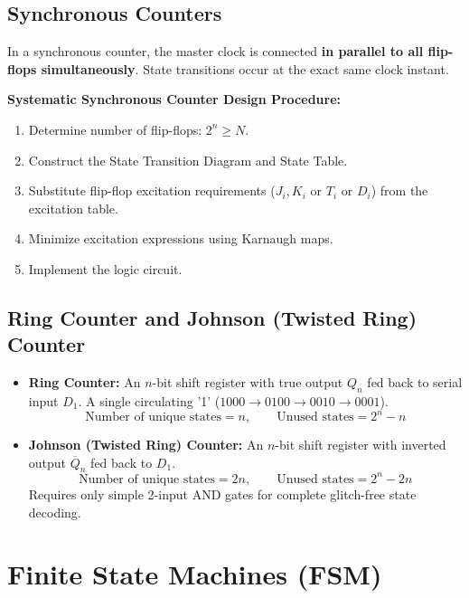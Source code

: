 \documentclass[12pt,a4paper]{article}
\begin{document}
\subsection{Synchronous Counters}
In a synchronous counter, the master clock is connected \textbf{in parallel to all flip-flops simultaneously}. State transitions occur at the exact same clock instant.

\textbf{Systematic Synchronous Counter Design Procedure:}
\begin{enumerate}[label=\arabic*., leftmargin=*]
  \item Determine number of flip-flops: $2^n \ge N$.
  \item Construct the State Transition Diagram and State Table.
  \item Substitute flip-flop excitation requirements ($J_i, K_i$ or $T_i$ or $D_i$) from the excitation table.
  \item Minimize excitation expressions using Karnaugh maps.
  \item Implement the logic circuit.
\end{enumerate}

\subsection{Ring Counter and Johnson (Twisted Ring) Counter}
\begin{itemize}[leftmargin=*, itemsep=3pt]
  \item \textbf{Ring Counter:} An $n$-bit shift register with true output $Q_n$ fed back to serial input $D_1$. A single circulating '1' ($1000 \to 0100 \to 0010 \to 0001$).
    \begin{equation}
      \text{Number of unique states} = n, \qquad \text{Unused states} = 2^n - n
    \end{equation}
  \item \textbf{Johnson (Twisted Ring) Counter:} An $n$-bit shift register with inverted output $\overline{Q}_n$ fed back to $D_1$.
    \begin{equation}
      \text{Number of unique states} = 2n, \qquad \text{Unused states} = 2^n - 2n
    \end{equation}
    Requires only simple 2-input AND gates for complete glitch-free state decoding.
\end{itemize}

\section{Finite State Machines (FSM)}
\end{document}
